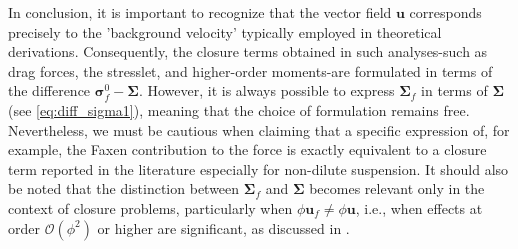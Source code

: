 In conclusion, it is important to recognize that the vector field \(\textbf{u}\) corresponds precisely to the 'background velocity' typically employed in theoretical derivations. 
Consequently, the closure terms obtained in such analyses-such as drag forces, the stresslet, and higher-order moments-are formulated in terms of the difference \(\bm\sigma_f^0 - \bm\Sigma\).
However, it is always possible to express \(\bm\Sigma_f\) in terms of \(\bm\Sigma\) (see \ref{eq:diff_sigma1}), meaning that the choice of formulation remains free. 
Nevertheless, we must be cautious when claiming that a specific expression of, for example, the Faxen contribution to the force is exactly equivalent to a closure term reported in the literature especially for non-dilute suspension. 
It should also be noted that the distinction between \(\bm\Sigma_f\) and \(\bm\Sigma\) becomes relevant only in the context of closure problems, particularly when \(\phi \textbf{u}_f \neq \phi \textbf{u}\), i.e., when effects at order \(\mathcal{O}(\phi^2)\) or higher are significant, as discussed in \citet{hinch1977averaged,kim1985modelling}.

